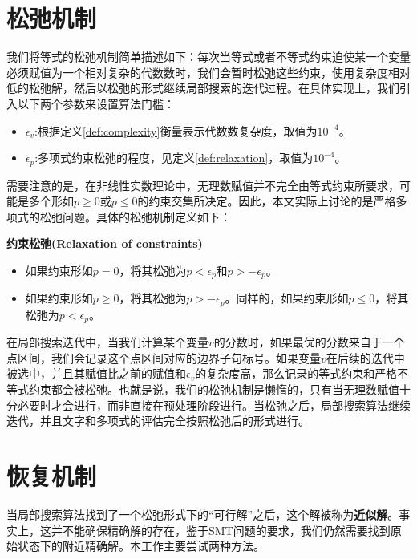 \section{松弛机制}
我们将等式的松弛机制简单描述如下：每次当等式或者不等式约束迫使某一个变量必须赋值为一个相对复杂的代数数时，我们会暂时松弛这些约束，使用复杂度相对低的松弛解，然后以松弛的形式继续局部搜索的迭代过程。在具体实现上，我们引入以下两个参数来设置算法门槛：
\begin{itemize}
    \item $\epsilon_v$:根据定义\ref{def:complexity}衡量表示代数数复杂度，取值为$10^{-4}$。
    \item $\epsilon_p$:多项式约束松弛的程度，见定义\ref{def:relaxation}，取值为$10^{-4}$。
\end{itemize}


需要注意的是，在非线性实数理论中，无理数赋值并不完全由等式约束所要求，可能是多个形如$p \ge 0$或$p \le 0$的约束交集所决定。因此，本文实际上讨论的是严格多项式的松弛问题。具体的松弛机制定义如下：

\begin{definition}{\textbf{约束松弛(Relaxation of constraints)}}
\label{def:relaxation}
\begin{itemize}
    \item 如果约束形如$p = 0$，将其松弛为$p < \epsilon_p$和$p > -\epsilon_p$。
    \item 如果约束形如$p \ge 0$，将其松弛为$p > -\epsilon_p$。同样的，如果约束形如$p \le 0$，将其松弛为$p < \epsilon_p$。
\end{itemize}
\end{definition}

在局部搜索迭代中，当我们计算某个变量$v$的分数时，如果最优的分数来自于一个点区间，我们会记录这个点区间对应的边界子句标号。如果变量$v$在后续的迭代中被选中，并且其赋值比之前的赋值和$\epsilon_v$的复杂度高，那么记录的等式约束和严格不等式约束都会被松弛。也就是说，我们的松弛机制是懒惰的，只有当无理数赋值十分必要时才会进行，而非直接在预处理阶段进行。当松弛之后，局部搜索算法继续迭代，并且文字和多项式的评估完全按照松弛后的形式进行。


\section{恢复机制}
当局部搜索算法找到了一个松弛形式下的“可行解”之后，这个解被称为\textbf{近似解}。事实上，这并不能确保精确解的存在，鉴于SMT问题的要求，我们仍然需要找到原始状态下的附近精确解。本工作主要尝试两种方法。


